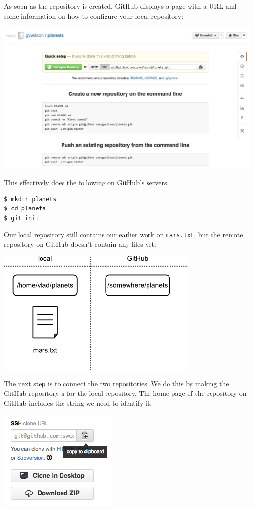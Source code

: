 \documentclass{book}
\begin{document}
As soon as the repository is created, GitHub displays a page with a URL
and some information on how to configure your local repository:

\includegraphics{novice/git/img/github-create-repo-03.png}

This effectively does the following on GitHub's servers:

\begin{verbatim}
$ mkdir planets
$ cd planets
$ git init
\end{verbatim}

Our local repository still contains our earlier work on
\texttt{mars.txt}, but the remote repository on GitHub doesn't contain
any files yet:

\includegraphics{novice/git/img/git-freshly-made-github-repo.png}

The next step is to connect the two repositories. We do this by making
the GitHub repository a  for the
local repository. The home page of the repository on GitHub includes the
string we need to identify it:

\includegraphics{novice/git/img/github-find-repo-string.png}
\end{document}
